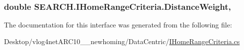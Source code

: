 \hypertarget{interface_s_e_a_r_c_h_1_1_i_home_range_criteria_aaa1d0ebf77c4d646ba37afc36cce8299}{
\subsubsection[{Distance\-Weight}]{\setlength{\rightskip}{0pt plus 5cm}double S\-E\-A\-R\-C\-H.\-I\-Home\-Range\-Criteria.\-Distance\-Weight\hspace{0.3cm}{\ttfamily [get]}, {\ttfamily [set]}}}\label{interface_s_e_a_r_c_h_1_1_i_home_range_criteria_aaa1d0ebf77c4d646ba37afc36cce8299}


The documentation for this interface was generated from the following file\-:\begin{DoxyCompactItemize}
\item 
Desktop/vlog4net\-A\-R\-C10\-\_\-\_\-newhoming/\-Data\-Centric/\hyperlink{_i_home_range_criteria_8cs}{I\-Home\-Range\-Criteria.\-cs}\end{DoxyCompactItemize}
